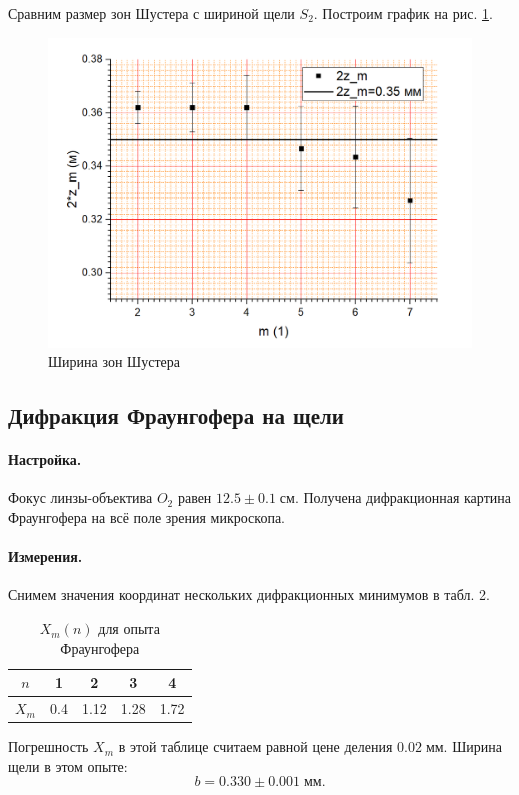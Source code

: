 \documentclass[a4paper]{article}
\begin{document}
Сравним размер зон Шустера с шириной щели $ S_2 $. Построим график на рис. \ref{fig:ШустерГрафик}.
\begin{figure}[tbp]
	\centering
	\includegraphics[width=0.8\linewidth]{Screenshot_6}
	\caption{Ширина зон Шустера}
	\label{fig:ШустерГрафик}
\end{figure}

\subsection{Дифракция Фраунгофера на щели}

\paragraph{Настройка.}

Фокус линзы-объектива $ O_2 $ равен $ 12.5\pm 0.1\; см $.
Получена дифракционная картина Фраунгофера на всё поле зрения микроскопа. 

\paragraph{Измерения.}

Снимем значения координат нескольких дифракционных минимумов в табл. 2.
\begin{table}[h]
	\centering
	\begin{tabular}{|c|c|c|c|c|}
		\hline
		$n$ & 1 & 2 & 3 & 4 \\
		\hline
		$X_m$ & 0.4 & 1.12 & 1.28 & 1.72 \\
		\hline
	\end{tabular}
	\label{tab:Фраунгофер}
	\caption{$ X_m (n) $ для опыта Фраунгофера }
\end{table}
Погрешность $ X_m $ в этой таблице считаем равной цене деления $ 0.02\; мм $. Ширина щели в этом опыте:
\begin{equation*}\label{key}
	b = 0.330 \pm 0.001 \; мм.
\end{equation*}
\end{document}
